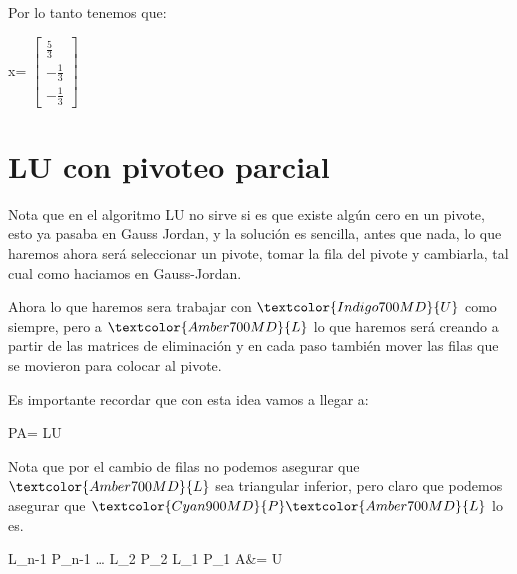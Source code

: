 \documentclass[12pt, fleqn]{report}                             %
\def \Eq {equation}                                             %
\newenvironment{MultiLineEquation*}[1]                          %
        {\begin{\Eq*}\begin{alignedat}{#1}}                         %
        {\end{alignedat}\end{\Eq*}}                                 %
\newcommand \Quote              {\qq}                           %
\theoremstyle{break}                                            %
\newcommand{\bVector}[1]                                        %
        { \ensuremath{\begin{bmatrix}#1\end{bmatrix}} }             %
\newcommand{\Color}[2]{\textcolor{#1}{#2}}                      %
\newcommand \ColorMatrixA       {Teal700MD}                     %
\newcommand \ColorVecX          {Green700MD}                    %
\newcommand \ColorMatrixL       {Amber700MD}                    %
\newcommand \ColorMatrixU       {Indigo700MD}                   %
\newcommand \ColorMatrixP       {Cyan900MD}                     %
\newcommand \MatrixA      {\Color{\ColorMatrixA}{A}}            %
\newcommand \VecX         {\Color{\ColorVecX}{\vec x}}          %
\newcommand \MatrixL      {\Color{\ColorMatrixL}{L}}            %
\newcommand \MatrixU      {\Color{\ColorMatrixU}{U}}            %
\newcommand \MatrixP      {\Color{\ColorMatrixP}{P}}            %
\begin{document}
            Por lo tanto tenemos que:
            \begin{MultiLineEquation*}{3}
                \VecX = \bVector{
                    \frac{5}{3} \\ -\frac{1}{3} \\ -\frac{1}{3}
                }
            \end{MultiLineEquation*}


        \clearpage
        \section{LU con pivoteo parcial}

            Nota que en el algoritmo \Quote{puro} LU no sirve si es que existe algún cero en un pivote, 
            esto ya pasaba en Gauss Jordan, y la solución es sencilla, antes que nada, lo que haremos ahora
            será seleccionar un pivote, tomar la fila del pivote y cambiarla, tal cual como haciamos en Gauss-Jordan.

            Ahora lo que haremos sera trabajar con $\MatrixU$ como siempre, pero a $\MatrixL$ lo que haremos
            será creando a partir de las matrices de eliminación y en cada paso también mover las filas que 
            se movieron para colocar al pivote.

            Es importante recordar que con esta idea vamos a llegar a:
            \begin{MultiLineEquation*}{3}
                \MatrixP \MatrixA = \MatrixL \MatrixU 
            \end{MultiLineEquation*}

            Nota que por el cambio de filas no podemos asegurar que $\MatrixL$ sea triangular inferior, pero claro que
            podemos asegurar que $\MatrixP \MatrixL$ lo es.
            \begin{MultiLineEquation*}{3}
                \Color{\ColorMatrixL}{\MatrixL_{n-1}}
                \Color{\ColorMatrixP}{\MatrixP_{n-1}}
                \dots
                \Color{\ColorMatrixL}{\MatrixL_{2}}
                \Color{\ColorMatrixP}{\MatrixP_{2}}
                \Color{\ColorMatrixL}{\MatrixL_{1}}
                \Color{\ColorMatrixP}{\MatrixP_{1}}
                \MatrixA &= \MatrixU
            \end{MultiLineEquation*}
\end{document}
